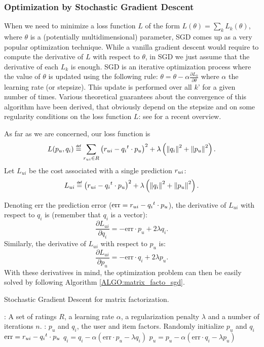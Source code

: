 \subsubsection{Optimization by Stochastic Gradient Descent}

When we need to minimize a loss function $L$ of the form $L(\theta) = \sum_k
L_k(\theta)$, where $\theta$ is a (potentially multidimensional) parameter, SGD
comes up as a very popular optimization technique. While a vanilla gradient
descent would require to compute the derivative of $L$ with respect to
$\theta$, in SGD we just assume that the derivative of each $L_k$ is enough.
SGD is an iterative optimization process where the value of $\theta$ is updated
using the following rule: $\theta = \theta - \alpha \frac{\partial
L_k}{\partial \theta}$ where $\alpha$ the learning rate (or stepsize). This
update is performed over all $k$' for a given number of times. Various
theoretical guarantees about the convergence of this algorithm have been
derived, that obviously depend on the stepsize and on some regularity
conditions on the loss function $L$: see \cite{BotCurNoc16} for a recent
overview.

As far as we are concerned, our loss function is
$$
L(p_u, q_i) \eqdef \sum_{\rui \in R} \left(\rui - {q_i}^t \cdot p_u \right)^2 +
\lambda\left(\norm{}{q_i}^2 + \norm{}{p_u}^2\right).
$$
Let $L_{ui}$ be the cost associated with a single prediction $r_{ui}$: $$L_{ui}
\eqdef \left(\rui - {q_i}^t \cdot p_u \right)^2 + \lambda\left(\norm{}{q_i}^2 +
\norm{}{p_u}^2\right).$$

Denoting err the prediction error ($\text{err} = r_{ui} - {q_i}^t \cdot p_u$), the
derivative of $L_{ui}$ with respect to $q_i$ is (remember that $q_i$ is a
vector):
$$\frac{\partial L_{ui}}{\partial q_i} = -\text{err} \cdot p_u + 2\lambda
q_i.$$
Similarly, the derivative of $L_{ui}$ with respect to $p_u$ is:
$$\frac{\partial L_{ui}}{\partial p_u} = -\text{err} \cdot q_i + 2\lambda
p_u.$$
With these derivatives in mind, the optimization problem can then be easily
solved by following Algorithm \ref{ALGO:matrix_facto_sgd}.

\begin{algorithm}[!ht]
 \caption{Stochastic Gradient Descent for matrix factorization.}
       \label{ALGO:matrix_facto_sgd}
       \begin{algorithmic}

         : A set of ratings $R$, a learning rate $\alpha$, a
         regularization penalty $\lambda$ and a number of iterations $n$.
         : $p_u$ and $q_i$, the user and item factors.
         \STATE Randomly initialize $p_u$ and $q_i$
         \STATE $\text{err} = r_{ui} - {q_i}^t \cdot p_u$
         \STATE $q_i = q_i - \alpha (\text{err} \cdot p_u - \lambda q_i)$
         \STATE $p_u = p_u - \alpha (\text{err} \cdot q_i - \lambda p_u)$
         \ENDFOR
         \ENDFOR
\end{algorithmic}
\end{algorithm}

